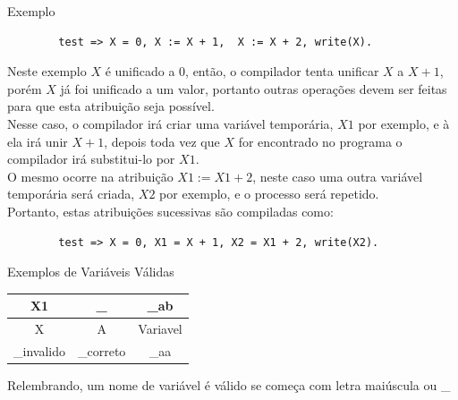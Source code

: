 \begin{frame}[fragile]
	
	\begin{exampleblock}{Exemplo}
		
		\begin{verbatim}
		test => X = 0, X := X + 1,  X := X + 2, write(X).
		\end{verbatim}
		Neste exemplo $X$ é unificado a $0$, então, o compilador tenta unificar $X$ a $X+1$, porém $X$ já 
		foi unificado a um valor, portanto outras operações devem ser feitas para que esta atribuição seja
		possível.\\
		
		Nesse caso, o compilador irá criar uma variável temporária, $X1$ por exemplo, e à ela irá unir
		$X+1$, depois toda vez que $X$ for encontrado no programa o compilador irá substitui-lo por $X1$.\\
		
		O mesmo ocorre na atribuição $X1 := X1 + 2$, neste caso uma outra variável temporária será criada,
		$X2$ por exemplo, e o processo será repetido.\\
		
		Portanto, estas atribuições sucessivas são compiladas como:
		
		\begin{verbatim}
		test => X = 0, X1 = X + 1, X2 = X1 + 2, write(X2).
		\end{verbatim} 
		
	\end{exampleblock}
	
\end{frame}


\begin{frame}[fragile]
	
	\begin{exampleblock}{Exemplos de Variáveis Válidas}
		
		\begin{center}
			\begin{tabular}{|c|c|c|}\hline
				X1 & \textbf{\_} & \_ab \\ \hline
				X & A & Variavel \\ \hline
				\_invalido & \_correto & \_aa \\ \hline
			\end{tabular}
		\end{center}
		
		Relembrando, um nome de variável é válido se começa com letra maiúscula ou \_
		
	\end{exampleblock}
	
\end{frame}

